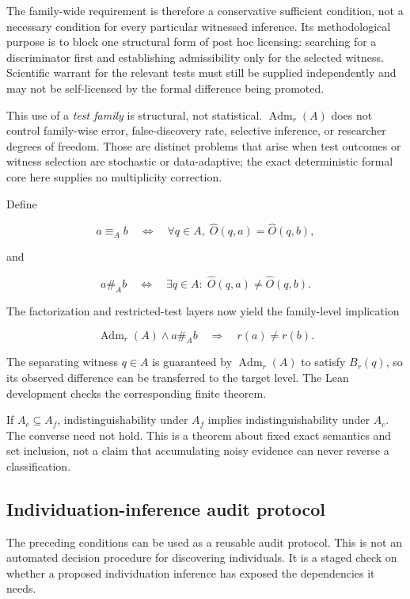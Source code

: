 \documentclass[11pt]{article}
\begin{document}
The family-wide requirement is therefore a conservative sufficient condition, not a necessary condition for every particular witnessed inference. Its methodological purpose is to block one structural form of post hoc licensing: searching for a discriminator first and establishing admissibility only for the selected witness. Scientific warrant for the relevant tests must still be supplied independently and may not be self-licensed by the formal difference being promoted.

This use of a \emph{test family} is structural, not statistical. \(\operatorname{Adm}_r(A)\) does not control family-wise error, false-discovery rate, selective inference, or researcher degrees of freedom. Those are distinct problems that arise when test outcomes or witness selection are stochastic or data-adaptive; the exact deterministic formal core here supplies no multiplicity correction.

Define

\[
a\equiv_A b
\quad\Longleftrightarrow\quad
\forall q\in A,\;
\widehat O(q,a)=\widehat O(q,b),
\]

and

\[
a\mathrel{\#_A}b
\quad\Longleftrightarrow\quad
\exists q\in A:\;
\widehat O(q,a)\neq\widehat O(q,b).
\]

The factorization and restricted-test layers now yield the family-level implication

\[
\operatorname{Adm}_r(A)
\land
a\mathrel{\#_A}b
\quad\Longrightarrow\quad
r(a)\neq r(b).
\]

The separating witness \(q\in A\) is guaranteed by \(\operatorname{Adm}_r(A)\) to satisfy \(B_r(q)\), so its observed difference can be transferred to the target level. The Lean development checks the corresponding finite theorem.

If \(A_c\subseteq A_f\), indistinguishability under \(A_f\) implies indistinguishability under \(A_c\). The converse need not hold. This is a theorem about fixed exact semantics and set inclusion, not a claim that accumulating noisy evidence can never reverse a classification.

\subsection{Individuation-inference audit protocol}

The preceding conditions can be used as a reusable audit protocol. This is not an automated decision procedure for discovering individuals. It is a staged check on whether a proposed individuation inference has exposed the dependencies it needs.
\end{document}

